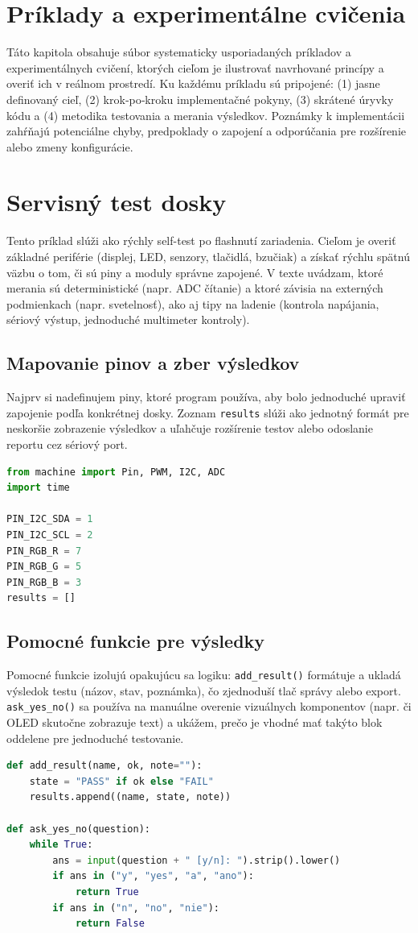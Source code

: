 \section{Príklady a experimentálne cvičenia}

Táto kapitola obsahuje súbor systematicky usporiadaných príkladov a experimentálnych cvičení, ktorých cieľom je ilustrovať navrhované princípy a overiť ich v reálnom prostredí. Ku každému príkladu sú pripojené: (1) jasne definovaný cieľ, (2) krok‑po‑kroku implementačné pokyny, (3) skrátené úryvky kódu a (4) metodika testovania a merania výsledkov. Poznámky k implementácii zahŕňajú potenciálne chyby, predpoklady o zapojení a odporúčania pre rozšírenie alebo zmeny konfigurácie.

\section{Servisný test dosky}
Tento príklad slúži ako rýchly self-test po flashnutí zariadenia. Cieľom je overiť základné periférie (displej, LED, senzory, tlačidlá, bzučiak) a získať rýchlu spätnú väzbu o tom, či sú piny a moduly správne zapojené. V texte uvádzam, ktoré merania sú deterministické (napr. ADC čítanie) a ktoré závisia na externých podmienkach (napr. svetelnosť), ako aj tipy na ladenie (kontrola napájania, sériový výstup, jednoduché multimeter kontroly).

\subsection*{Mapovanie pinov a zber výsledkov}
Najprv si nadefinujem piny, ktoré program používa, aby bolo jednoduché upraviť zapojenie podľa konkrétnej dosky. Zoznam \lstinline|results| slúži ako jednotný formát pre neskoršie zobrazenie výsledkov a uľahčuje rozšírenie testov alebo odoslanie reportu cez sériový port.
\begin{lstlisting}[language=Python]
from machine import Pin, PWM, I2C, ADC
import time

PIN_I2C_SDA = 1
PIN_I2C_SCL = 2
PIN_RGB_R = 7
PIN_RGB_G = 5
PIN_RGB_B = 3
results = []
\end{lstlisting}

\subsection*{Pomocné funkcie pre výsledky}
Pomocné funkcie izolujú opakujúcu sa logiku: \texttt{add\_result()} formátuje a ukladá výsledok testu (názov, stav, poznámka), čo zjednoduší tlač správy alebo export. \texttt{ask\_yes\_no()} sa používa na manuálne overenie vizuálnych komponentov (napr. či OLED skutočne zobrazuje text) a ukážem, prečo je vhodné mať takýto blok oddelene pre jednoduché testovanie.
\begin{lstlisting}[language=Python]
def add_result(name, ok, note=""):
	state = "PASS" if ok else "FAIL"
	results.append((name, state, note))

def ask_yes_no(question):
	while True:
		ans = input(question + " [y/n]: ").strip().lower()
		if ans in ("y", "yes", "a", "ano"):
			return True
		if ans in ("n", "no", "nie"):
			return False
\end{lstlisting}

